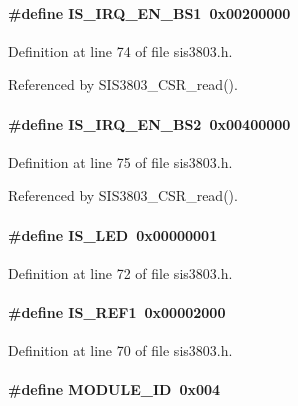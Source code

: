 \paragraph[{IS\_\-IRQ\_\-EN\_\-BS1}]{\setlength{\rightskip}{0pt plus 5cm}\#define IS\_\-IRQ\_\-EN\_\-BS1~0x00200000}\hfill\label{sis3803_8h_af172798be2b2367b323070891eda6e91}


Definition at line 74 of file sis3803.h.

Referenced by SIS3803\_\-CSR\_\-read().
\paragraph[{IS\_\-IRQ\_\-EN\_\-BS2}]{\setlength{\rightskip}{0pt plus 5cm}\#define IS\_\-IRQ\_\-EN\_\-BS2~0x00400000}\hfill\label{sis3803_8h_ab997f9dce7042256e12dfcef4bcc1c90}


Definition at line 75 of file sis3803.h.

Referenced by SIS3803\_\-CSR\_\-read().
\paragraph[{IS\_\-LED}]{\setlength{\rightskip}{0pt plus 5cm}\#define IS\_\-LED~0x00000001}\hfill\label{sis3803_8h_a1675b13057e5ae3fb361e87d4053de4b}


Definition at line 72 of file sis3803.h.
\paragraph[{IS\_\-REF1}]{\setlength{\rightskip}{0pt plus 5cm}\#define IS\_\-REF1~0x00002000}\hfill\label{sis3803_8h_a6afdc5e84cf76ab272454aad24e9186e}


Definition at line 70 of file sis3803.h.
\paragraph[{MODULE\_\-ID}]{\setlength{\rightskip}{0pt plus 5cm}\#define MODULE\_\-ID~0x004}\hfill\label{sis3803_8h_aa407a75a23bf77b26269d3932ec0ff5f}


